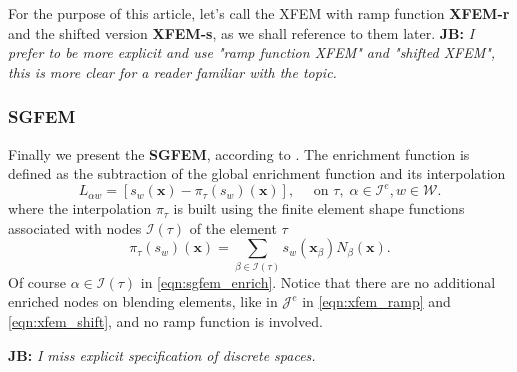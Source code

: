 \documentclass[preprint,12pt]{elsarticle}
\def\vc#1{\mathbf{\boldsymbol{#1}}}     %
\newcommand{\bx}{\vc{x}}
\newcommand{\noteJB}[1]{{\color{Blue} \textbf{JB: } \textit{#1}}}
\begin{document}
For the purpose of this article, let's call the XFEM with ramp function \textbf{XFEM-r} and the shifted 
version \textbf{XFEM-s}, as we shall reference to them later.
\noteJB{I prefer to be more explicit and use "ramp function XFEM" and "shifted XFEM", this is more clear for a reader familiar with the topic.}

\subsubsection{SGFEM}
Finally we present the \textbf{SGFEM}, according to \cite{sgfem,sgfem2013}. The enrichment function is defined
as the subtraction of the global enrichment function and its interpolation 
\begin{equation} \label{eqn:sgfem_enrich}
    L_{\alpha w} = \left[s_w(\bx) - \pi_\tau (s_w)(\bx)\right],
    \quad \textrm{ on } \tau,\; \alpha\in\mathcal{I}^e, w\in\mathcal{W}.
\end{equation} 
where the interpolation $\pi_\tau$ is built using the finite element shape functions
associated with nodes $\mathcal{I}(\tau)$ of the element $\tau$
\begin{equation} \label{eqn:sgfem_interpolation}
    \pi_\tau (s_w)(\bx) = \sum\limits_{\beta\in\mathcal{I}(\tau)} s_w(\bx_\beta) N_\beta(\bx).
\end{equation}
Of course $\alpha\in\mathcal{I}(\tau)$ in \eqref{eqn:sgfem_enrich}.
Notice that there are no additional enriched nodes on blending elements, like in $\mathcal{J}^e$ in 
\eqref{eqn:xfem_ramp} and \eqref{eqn:xfem_shift}, and no ramp function is involved.

\noteJB{I miss explicit specification of discrete spaces.}
\end{document}
